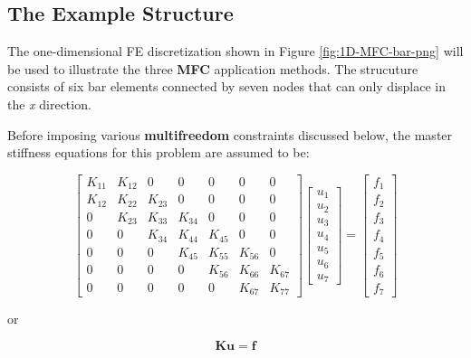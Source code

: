 \documentclass[10pt,b5paper,titlepage]{book}
\newcommand{\m}{\mathbf}
\begin{document}
\subsection{The Example Structure}

The one-dimensional FE discretization shown in Figure \ref{fig:1D-MFC-bar-png}
will be used to illustrate the three \textbf{MFC} application methods. The
strucuture consists of six bar elements connected by seven nodes that can only
displace in the \textit{x} direction.

Before imposing various \textbf{multifreedom} constraints discussed below, the master
stiffness equations for this problem are assumed to be:

\begin{equation}\label{master-stiffness-6-bar}
    \begin{bmatrix}
        K_{11} & K_{12} & 0 & 0 & 0 & 0 & 0 \\
        K_{12} & K_{22} & K_{23} & 0 & 0 & 0 & 0 \\
        0 & K_{23} & K_{33} & K_{34} & 0 & 0 & 0 \\
        0 & 0 & K_{34} & K_{44} & K_{45} & 0 & 0 \\
        0 & 0 & 0 & K_{45} & K_{55} & K_{56} & 0 \\
        0 & 0 & 0 & 0 & K_{56} & K_{66} & K_{67} \\
        0 & 0 & 0 & 0 & 0 & K_{67} & K_{77}
    \end{bmatrix}
    \begin{bmatrix}
        u_1 \\
        u_2 \\
        u_3 \\
        u_4 \\
        u_5 \\
        u_6 \\
        u_7
    \end{bmatrix}
    = \begin{bmatrix}
        f_1 \\
        f_2 \\
        f_3 \\
        f_4 \\
        f_5 \\
        f_6 \\
        f_7
    \end{bmatrix}
\end{equation}

or

\begin{equation}\label{mfc-ms-master-equation}
    \m{K} \m{u} = \m{f}
\end{equation}
\end{document}
